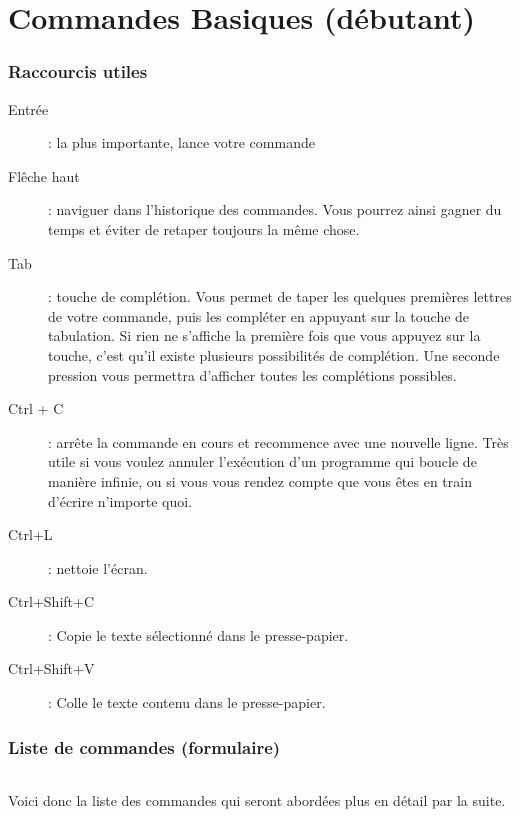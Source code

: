 \documentclass[french, a4paper, 12pt, titlepage]{article}
\begin{document}
\part{Commandes Basiques (débutant)}

\section{Raccourcis utiles}

\begin{description}
	\item[Entrée]: la plus importante, lance votre commande
	\item[Flêche haut]: naviguer dans l'historique des commandes. Vous pourrez
		ainsi gagner du temps et éviter de retaper toujours la même chose.
	\item[Tab]: touche de complétion. Vous permet de taper les quelques
		premières lettres de votre commande, puis les compléter en appuyant sur
		la touche de tabulation. Si rien ne s'affiche la première fois que vous
		appuyez sur la touche, c'est qu'il existe plusieurs possibilités de
		complétion. Une seconde pression vous permettra d'afficher toutes les
		complétions possibles.
	\item[Ctrl + C]: arrête la commande en cours et recommence avec une
		nouvelle ligne. Très utile si vous voulez annuler l'exécution d'un
		programme qui boucle de manière infinie, ou si vous vous rendez compte
		que vous êtes en train d'écrire n'importe quoi.
	\item[Ctrl+L]: nettoie l'écran.
	\item[Ctrl+Shift+C]: Copie le texte sélectionné dans le presse-papier.
	\item[Ctrl+Shift+V]: Colle le texte contenu dans le presse-papier.
\end{description}

\section{Liste de commandes (formulaire)}

\paragraph{} Voici donc la liste des commandes qui seront abordées plus en
détail par la suite.
\end{document}
